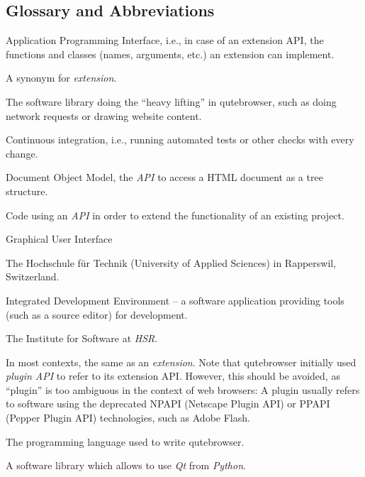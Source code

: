 
\begin{appendices}
\chapter{Glossary and Abbreviations}
\begin{multicols}{2}
\label{ch:glossary}
\begin{description}[leftmargin=0pt]
  \item[API]{Application Programming Interface, i.e., in
      case of an extension API, the functions and classes (names, arguments,
      etc.) an extension can implement.}
  \item[add-on]{A synonym for \emph{extension}.}
  \item[backend]{The software library doing the ``heavy lifting'' in
      qutebrowser, such as doing network requests or drawing website content.}
  \item[CI]{Continuous integration, i.e., running automated tests or other
      checks with every change.}
  \item[DOM]{Document Object Model, the \emph{API} to access a HTML document as
      a tree structure.}
  \item[extension]{Code using an \emph{API} in order to extend the functionality
      of an existing project.}
  \item[GUI]{Graphical User Interface}
  \item[HSR]{The Hochschule für Technik (University of Applied Sciences) in
      Rapperswil, Switzerland.}
  \item[IDE]{Integrated Development Environment -- a software application
      providing tools (such as a source editor) for development.}
  \item[IFS]{The Institute for Software at \emph{HSR}.}
  \item[plugin]{In most contexts, the same as an \emph{extension}. Note that
      qutebrowser initially used \emph{plugin API} to refer to its extension
      API. However, this should be avoided, as ``plugin'' is too ambiguous in
      the context of web browsers: A plugin usually refers to software using the
      deprecated NPAPI (Netscape Plugin API) or PPAPI (Pepper Plugin API)
      technologies, such as Adobe Flash.}
  \item[Python]{The programming language used to write qutebrowser.}
  \item[PyQt]{A software library which allows to use \emph{Qt} from \emph{Python}.}

\end{description}
\end{multicols}
\end{appendices}
